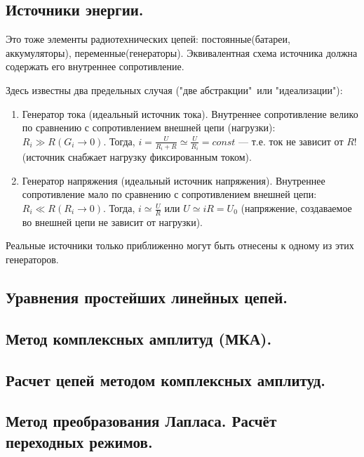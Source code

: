 \documentclass[../main/main.tex]{subfiles}
\begin{document}
\subsection{Источники энергии.}

Это тоже элементы радиотехнических цепей: постоянные(батареи, аккумуляторы), переменные(генераторы). Эквивалентная схема источника должна содержать его внутреннее сопротивление. 

Здесь известны два предельных случая ("две абстракции"\ или "идеализации"):

\begin{enumerate}
    \item Генератор тока (идеальный источник тока).
        Внутреннее сопротивление велико по сравнению с сопротивлением внешней цепи (нагрузки): $R_i \gg R (G_i \rightarrow 0)$. Тогда, $i = \frac{U}{R_i + R} \simeq \frac{U}{R_i} = const$ --- т.е. ток не зависит от $R$! (источник снабжает нагрузку фиксированным током). 
    
    \item Генератор напряжения (идеальный источник напряжения).
     Внутреннее сопротивление мало по сравнению с сопротивлением внешней цепи: $R_i \ll R (R_i \rightarrow 0)$. Тогда, $i \simeq \frac{U}{R}$ или $U \simeq iR = U_0$ (напряжение, создаваемое во внешней цепи не зависит от нагрузки).  
\end{enumerate}

Реальные источники только приближенно могут быть отнесены к одному из этих генераторов.

\subsection{Уравнения простейших линейных цепей.}

\subsection{Метод комплексных амплитуд (МКА).}

\subsection{Расчет цепей методом комплексных амплитуд.}

\subsection{Метод преобразования Лапласа. Расчёт переходных режимов.}
\end{document}
